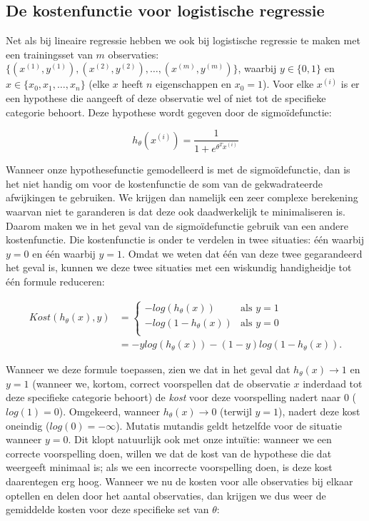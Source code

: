 \subsection{De kostenfunctie voor logistische regressie}
Net als bij lineaire regressie hebben we ook bij logistische regressie te maken met een trainingsset van $m$ observaties: $\{(x^{(1)}, y^{(1)}), (x^{(2)}, y^{(2)}), \hdots, (x^{(m)}, y^{(m)})\}$, waarbij $y \in \{0,1\}$ en $x \in \{x_0, x_1, \hdots, x_n\}$ (elke $x$ heeft $n$ eigenschappen en $x_0=1$). Voor elke $x^{(i)}$ is er een hypothese die aangeeft of deze observatie wel of niet tot de specifieke categorie behoort. Deze hypothese wordt gegeven door de sigmoïdefunctie:

\[
h_\theta(x^{(i)}) = \frac{1}{1+e^{\theta^Tx^{(i)}}}
\]

Wanneer onze hypothesefunctie gemodelleerd is met de sigmoïdefunctie, dan is het niet handig om voor de kostenfunctie de som van de gekwadrateerde afwijkingen te gebruiken. We krijgen dan namelijk een zeer complexe berekening waarvan niet te garanderen is dat deze ook daadwerkelijk te minimaliseren is. Daarom maken we in het geval van de sigmoïdefunctie gebruik van een andere kostenfunctie. Die kostenfunctie is onder te verdelen in twee situaties: één waarbij $y=0$ en één waarbij $y=1$. Omdat we weten dat één van deze twee gegarandeerd het geval is, kunnen we deze twee situaties met een wiskundig handigheidje tot één formule reduceren:

\[
\begin{aligned}
Kost(h_\theta(x), y) &= 
\begin{cases}
  -log(h_\theta(x)) & \text{als $y=1$} \\
  -log(1-h_\theta(x)) & \text{als $y=0$} \\
\end{cases}\\
&= -ylog(h_\theta(x)) - (1-y)log(1-h_\theta(x)).
\end{aligned}
\]

Wanneer we deze formule toepassen, zien we dat in het geval dat $h_\theta(x) \rightarrow 1$ en $y=1$ (wanneer we, kortom, correct voorspellen dat de observatie $x$ inderdaad tot deze specifieke categorie behoort) de \textit{kost} voor deze voorspelling nadert naar 0 ($log(1)=0$). Omgekeerd, wanneer $h_\theta(x) \rightarrow 0$ (terwijl $y=1$), nadert deze kost oneindig ($log(0)=-\infty$). Mutatis mutandis geldt hetzelfde voor de situatie wanneer $y=0$. Dit klopt natuurlijk ook met onze intuïtie: wanneer we een correcte voorspelling doen, willen we dat de kost van de hypothese die dat weergeeft minimaal is; als we een incorrecte voorspelling doen, is deze kost daarentegen erg hoog. Wanneer we nu de kosten voor alle observaties bij elkaar optellen en delen door het aantal observaties, dan krijgen we dus weer de gemiddelde kosten voor deze specifieke set van $\theta$:

